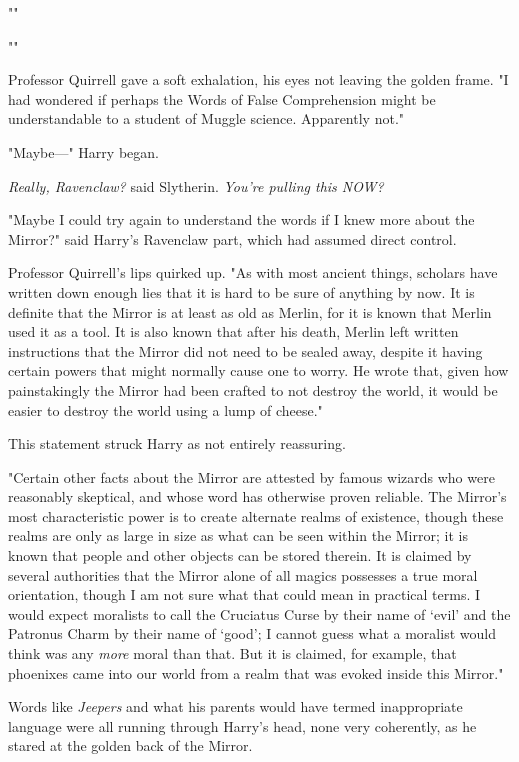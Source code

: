 ""

""

Professor Quirrell gave a soft exhalation, his eyes not leaving the golden
frame. "I had wondered if perhaps the Words of False Comprehension might be
understandable to a student of Muggle science. Apparently not."

"Maybe—" Harry began.

\emph{Really, Ravenclaw?} said Slytherin. \emph{You're pulling this NOW?}

"Maybe I could try again to understand the words if I knew more about the
Mirror?" said Harry's Ravenclaw part, which had assumed direct control.

Professor Quirrell's lips quirked up. "As with most ancient things, scholars
have written down enough lies that it is hard to be sure of anything by now. It
is definite that the Mirror is at least as old as Merlin, for it is known that
Merlin used it as a tool. It is also known that after his death, Merlin left
written instructions that the Mirror did not need to be sealed away, despite it
having certain powers that might normally cause one to worry. He wrote that,
given how painstakingly the Mirror had been crafted to not destroy the world,
it would be easier to destroy the world using a lump of cheese."

This statement struck Harry as not entirely reassuring.

"Certain other facts about the Mirror are attested by famous wizards who were
reasonably skeptical, and whose word has otherwise proven reliable. The
Mirror's most characteristic power is to create alternate realms of existence,
though these realms are only as large in size as what can be seen within the
Mirror; it is known that people and other objects can be stored therein. It is
claimed by several authorities that the Mirror alone of all magics possesses a
true moral orientation, though I am not sure what that could mean in practical
terms. I would expect moralists to call the Cruciatus Curse by their name of
`evil' and the Patronus Charm by their name of `good'; I cannot guess what a
moralist would think was any \emph{more} moral than that. But it is claimed,
for example, that phoenixes came into our world from a realm that was evoked
inside this Mirror."



Words like \emph{Jeepers} and what his parents would have termed inappropriate
language were all running through Harry's head, none very coherently, as he
stared at the golden back of the Mirror.

